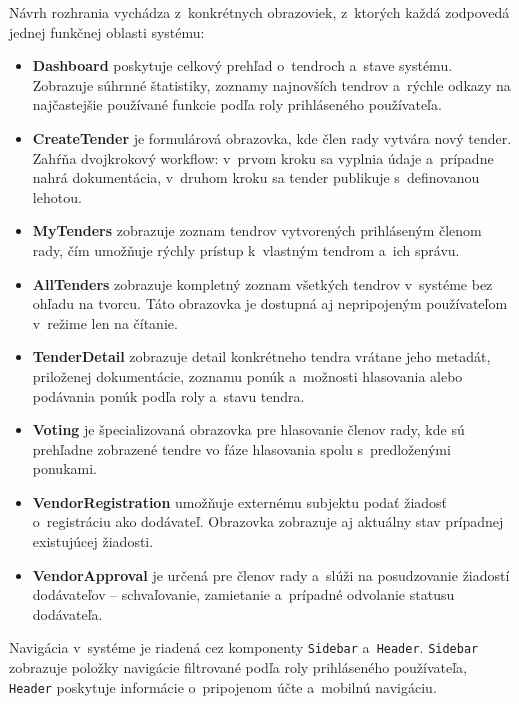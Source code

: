 Návrh rozhrania vychádza z~konkrétnych obrazoviek, z~ktorých každá zodpovedá
jednej funkčnej oblasti systému:
\begin{itemize}
    \item \textbf{Dashboard} poskytuje celkový prehľad o~tendroch a~stave
    systému. Zobrazuje súhrnné štatistiky, zoznamy najnovších tendrov
    a~rýchle odkazy na najčastejšie používané funkcie podľa roly
    prihláseného používateľa.

    \item \textbf{CreateTender} je formulárová obrazovka, kde člen rady
    vytvára nový tender. Zahŕňa dvojkrokový workflow: v~prvom kroku sa
    vyplnia údaje a~prípadne nahrá dokumentácia, v~druhom kroku sa tender
    publikuje s~definovanou lehotou.

    \item \textbf{MyTenders} zobrazuje zoznam tendrov vytvorených
    prihláseným členom rady, čím umožňuje rýchly prístup k~vlastným
    tendrom a~ich správu.

    \item \textbf{AllTenders} zobrazuje kompletný zoznam všetkých tendrov
    v~systéme bez ohľadu na tvorcu. Táto obrazovka je dostupná aj
    nepripojeným používateľom v~režime len na čítanie.

    \item \textbf{TenderDetail} zobrazuje detail konkrétneho tendra
    vrátane jeho metadát, priloženej dokumentácie, zoznamu ponúk
    a~možnosti hlasovania alebo podávania ponúk podľa roly a~stavu
    tendra.

    \item \textbf{Voting} je špecializovaná obrazovka pre hlasovanie
    členov rady, kde sú prehľadne zobrazené tendre vo fáze hlasovania
    spolu s~predloženými ponukami.

    \item \textbf{VendorRegistration} umožňuje externému subjektu podať
    žiadosť o~registráciu ako dodávateľ. Obrazovka zobrazuje aj aktuálny
    stav prípadnej existujúcej žiadosti.

    \item \textbf{VendorApproval} je určená pre členov rady a~slúži na
    posudzovanie žiadostí dodávateľov -- schvaľovanie, zamietanie
    a~prípadné odvolanie statusu dodávateľa.
\end{itemize}

Navigácia v~systéme je riadená cez komponenty \texttt{Sidebar}
a~\texttt{Header}. \texttt{Sidebar} zobrazuje položky navigácie
filtrované podľa roly prihláseného používateľa, \texttt{Header}
poskytuje informácie o~pripojenom účte a~mobilnú navigáciu.

